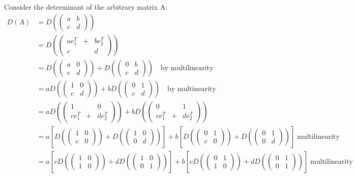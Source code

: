 \documentclass[11pt]{article}
\begin{document}
Consider the determinant of the arbitrary matrix A:
\begin{align*}
D(A) &= D(\begin{pmatrix}
a&b\\c&d
\end{pmatrix})\\ &= D(\begin{pmatrix}
ae_1^T&+ & be_2^T \\ c & & d
\end{pmatrix})\\ &=D(\begin{pmatrix}
a&0\\c&d
\end{pmatrix}) + D(\begin{pmatrix}
0&b\\c&d
\end{pmatrix}) \quad \text{by multilinearity} \\
&=aD(\begin{pmatrix}
1&0\\c&d
\end{pmatrix}) + bD(\begin{pmatrix}
0&1\\c&d
\end{pmatrix}) \quad \text{by multinearity}\\
&= aD(\begin{pmatrix}
1& &0\\ ce_1^T &+& de_2^T
\end{pmatrix}) + bD(\begin{pmatrix}
0& &1\\ce_1^T &+& de_2^T
\end{pmatrix})\\
&=a\left[D(\begin{pmatrix}
1 & 0 \\ c&0
\end{pmatrix}) + D(\begin{pmatrix}
1 & 0 \\ 0&d
\end{pmatrix})\right] + b\left[D(\begin{pmatrix}
0 & 1 \\ c&0
\end{pmatrix}) + D(\begin{pmatrix}
0 & 1 \\ 0&d
\end{pmatrix})\right] \; \text{multilinearity} \\
&= a\left[cD(\begin{pmatrix}
1 & 0 \\ 1&0
\end{pmatrix}) + dD(\begin{pmatrix}
1 & 0 \\ 0&1
\end{pmatrix})\right] + b\left[cD(\begin{pmatrix}
0 & 1 \\ 1&0
\end{pmatrix}) + dD(\begin{pmatrix}
0 & 1 \\ 0&1
\end{pmatrix})\right] \; \text{multilinearity}
\end{align*}
\end{document}
